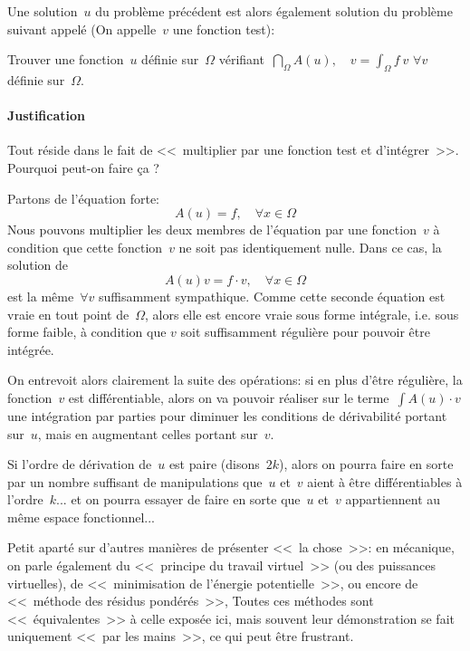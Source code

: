 \medskip
Une solution~$u$ du problème précédent est alors également solution du problème suivant
appelé  (On appelle~$v$ une fonction test):
\begin{center}
  Trouver une fonction~$u$ définie sur~$\Omega$ vérifiant~$\dint_\Omega A(u),\quad v = \int_\Omega f\ v$
$\forall v$ définie sur~$\Omega$.
\end{center}



\medskip{}%
\medskip

%


\paragraph{Justification}
Tout réside dans le fait de <<~multiplier par une fonction test et d'intégrer~>>.
Pourquoi peut-on faire ça ?

Partons de l'équation forte:
\begin{equation}A(u)=f,\quad \forall x\in\Omega\end{equation}
Nous pouvons multiplier les deux membres de l'équation par une fonction~$v$ à
condition que cette fonction~$v$ ne soit pas identiquement nulle. Dans ce cas, la solution de
\begin{equation}A(u)v=f\cdot v,\quad \forall x\in\Omega\end{equation} est la même~$\forall v$ suffisamment sympathique.
Comme cette seconde équation est vraie en tout point de~$\Omega$, alors elle
est encore vraie sous forme intégrale, i.e. sous forme faible, à condition que
$v$ soit suffisamment régulière pour pouvoir être intégrée.

On entrevoit alors clairement la suite des opérations: si en plus d'être régulière,
la fonction~$v$ est différentiable, alors on va pouvoir réaliser sur le terme~$\int A(u)\cdot v$
une intégration par parties pour diminuer les conditions de dérivabilité portant sur~$u$,
mais en augmentant celles portant sur~$v$.

Si l'ordre de dérivation de~$u$ est paire (disons~$2k$), alors on pourra faire en sorte
par un nombre suffisant de manipulations que~$u$ et~$v$ aient à être différentiables
à l'ordre~$k$... et on pourra essayer de faire en sorte que~$u$ et~$v$ appartiennent au
même espace fonctionnel...

\medskip
{}
Petit aparté sur d'autres manières de présenter <<~la chose~>>:
en mécanique, on parle également du <<~principe du travail virtuel~>> (ou des puissances virtuelles),
de <<~minimisation de l'énergie potentielle~>>, ou encore de <<~méthode des résidus pondérés~>>,
Toutes ces méthodes sont <<~équivalentes~>> à celle exposée ici, mais souvent
leur démonstration se fait uniquement <<~par les mains~>>, ce qui peut être
frustrant.

